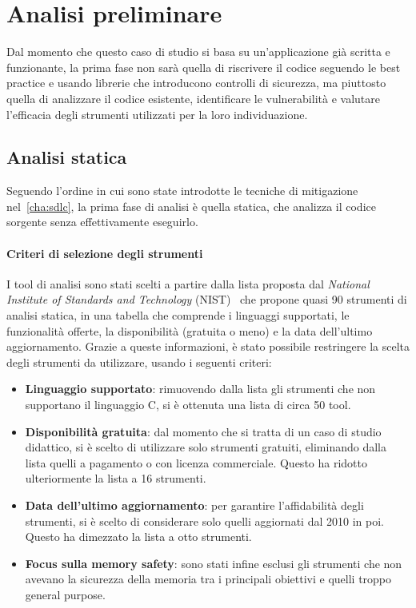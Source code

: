 \section{Analisi preliminare}
\label{sec:initial_analysis}

Dal momento che questo caso di studio si basa su un'applicazione già scritta e funzionante,
la prima fase non sarà quella di riscrivere il codice seguendo le best practice
e usando librerie che introducono controlli di sicurezza, ma piuttosto quella di
analizzare il codice esistente, identificare le vulnerabilità e valutare l'efficacia
degli strumenti utilizzati per la loro individuazione.

\subsection*{Analisi statica}
Seguendo l'ordine in cui sono state introdotte le tecniche di mitigazione nel~\autoref{cha:sdlc},
la prima fase di analisi è quella statica, che analizza il codice sorgente senza
effettivamente eseguirlo.

\paragraph{Criteri di selezione degli strumenti}
I tool di analisi sono stati scelti a partire dalla lista proposta dal \textit{National
Institute of Standards and Technology} (NIST)~\cite{nist_sast_list} che propone
quasi 90 strumenti di analisi statica, in una tabella che comprende i linguaggi supportati,
le funzionalità offerte, la disponibilità (gratuita o meno) e la data dell'ultimo
aggiornamento. Grazie a queste informazioni, è stato possibile restringere la scelta
degli strumenti da utilizzare, usando i seguenti criteri:
\begin{itemize}
  \item \textbf{Linguaggio supportato}: rimuovendo dalla lista gli strumenti che
    non supportano il linguaggio C, si è ottenuta una lista di circa 50 tool.

  \item \textbf{Disponibilità gratuita}: dal momento che si tratta di un caso di
    studio didattico, si è scelto di utilizzare solo strumenti gratuiti, eliminando
    dalla lista quelli a pagamento o con licenza commerciale. Questo ha ridotto
    ulteriormente la lista a 16 strumenti.

  \item \textbf{Data dell'ultimo aggiornamento}: per garantire l'affidabilità degli
    strumenti, si è scelto di considerare solo quelli aggiornati dal 2010 in poi.
    Questo ha dimezzato la lista a otto strumenti.

  \item \textbf{Focus sulla memory safety}: sono stati infine esclusi gli strumenti
    che non avevano la sicurezza della memoria tra i principali obiettivi e quelli
    troppo general purpose.
\end{itemize}

